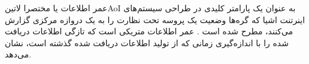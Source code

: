 
عمر اطلاعات یا مختصرا ‌لاتین{AoI} به عنوان یک پارامتر کلیدی
در طراحی سیستم‌های اینرتنت اشیا که گره‌ها وضعیت یک پروسه تحت نظارت را به یک دروازه مرکزی گزارش می‌کنند،
مطرح شده است .
عمر اطلاعات متریکی است که تازگی اطلاعات دریافت شده را با اندازه‌گیری زمانی که از تولید اطلاعات دریافت شده گذشته است، نشان می‌دهد.
